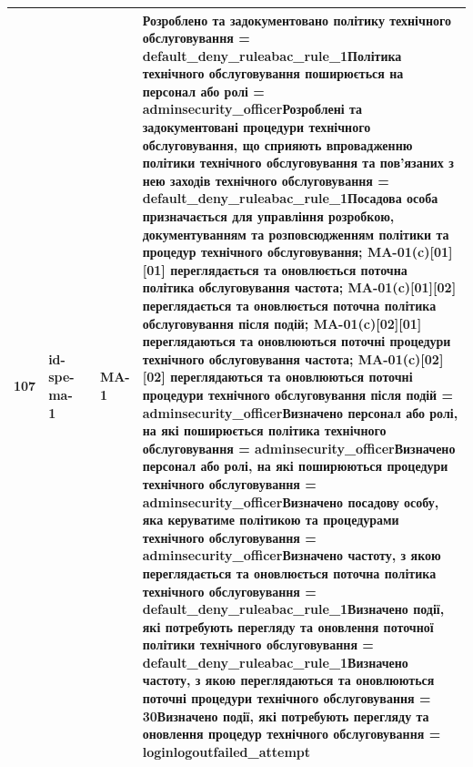 \documentclass[10pt]{article}
\begin{document}
\begin{longtable}{|c|>{\raggedright\arraybackslash}p{4cm}|>{\raggedright\arraybackslash}p{2.5cm}|>{\raggedright\arraybackslash}p{3.5cm}|>{\raggedright\arraybackslash}p{5.5cm}|}
107 & id-spe-ma-1 &  & MA-1 & Розроблено та задокументовано політику технічного обслуговування = \textbf{default\_\allowbreak{}deny\_\allowbreak{}ruleabac\_\allowbreak{}rule\_\allowbreak{}1}\newline Політика технічного обслуговування поширюється на персонал або ролі = \textbf{adminsecurity\_\allowbreak{}officer}\newline Розроблені та задокументовані процедури технічного обслуговування, що сприяють впровадженню політики технічного обслуговування та пов'язаних з нею заходів технічного обслуговування = \textbf{default\_\allowbreak{}deny\_\allowbreak{}ruleabac\_\allowbreak{}rule\_\allowbreak{}1}\newline Посадова особа призначається для управління розробкою, документуванням та розповсюдженням політики та процедур технічного обслуговування; MA-01(c)[01][01] переглядається та оновлюється поточна політика обслуговування частота; MA-01(c)[01][02] переглядається та оновлюється поточна політика обслуговування після подій; MA-01(c)[02][01] переглядаються та оновлюються поточні процедури технічного обслуговування частота; MA-01(c)[02][02] переглядаються та оновлюються поточні процедури технічного обслуговування після подій = \textbf{adminsecurity\_\allowbreak{}officer}\newline Визначено персонал або ролі, на які поширюється політика технічного обслуговування = \textbf{adminsecurity\_\allowbreak{}officer}\newline Визначено персонал або ролі, на які поширюються процедури технічного обслуговування = \textbf{adminsecurity\_\allowbreak{}officer}\newline Визначено посадову особу, яка керуватиме політикою та процедурами технічного обслуговування = \textbf{adminsecurity\_\allowbreak{}officer}\newline Визначено частоту, з якою переглядається та оновлюється поточна політика технічного обслуговування = \textbf{default\_\allowbreak{}deny\_\allowbreak{}ruleabac\_\allowbreak{}rule\_\allowbreak{}1}\newline Визначено події, які потребують перегляду та оновлення поточної політики технічного обслуговування = \textbf{default\_\allowbreak{}deny\_\allowbreak{}ruleabac\_\allowbreak{}rule\_\allowbreak{}1}\newline Визначено частоту, з якою переглядаються та оновлюються поточні процедури технічного обслуговування = \textbf{30}\newline Визначено події, які потребують перегляду та оновлення процедур технічного обслуговування = \textbf{loginlogoutfailed\_\allowbreak{}attempt} \\ \hline

\end{longtable}
\end{document}
